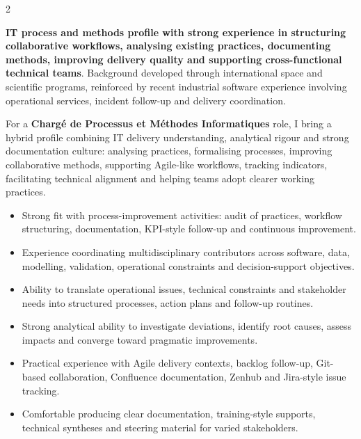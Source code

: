 \documentclass[8pt,a4paper,ragged2e,withhyper]{altacv}
\begin{document}
\begin{paracol}{2}
\switchcolumn


\textbf{IT process and methods profile with strong experience in structuring collaborative workflows, analysing existing practices, documenting methods, improving delivery quality and supporting cross-functional technical teams}. Background developed through international space and scientific programs, reinforced by recent industrial software experience involving operational services, incident follow-up and delivery coordination.

For a \textbf{Chargé de Processus et Méthodes Informatiques} role, I bring a hybrid profile combining IT delivery understanding, analytical rigour and strong documentation culture: analysing practices, formalising processes, improving collaborative methods, supporting Agile-like workflows, tracking indicators, facilitating technical alignment and helping teams adopt clearer working practices.

\begin{itemize}
  \item Strong fit with process-improvement activities: audit of practices, workflow structuring, documentation, KPI-style follow-up and continuous improvement.
  \item Experience coordinating multidisciplinary contributors across software, data, modelling, validation, operational constraints and decision-support objectives.
  \item Ability to translate operational issues, technical constraints and stakeholder needs into structured processes, action plans and follow-up routines.
  \item Strong analytical ability to investigate deviations, identify root causes, assess impacts and converge toward pragmatic improvements.
  \item Practical experience with Agile delivery contexts, backlog follow-up, Git-based collaboration, Confluence documentation, Zenhub and Jira-style issue tracking.
  \item Comfortable producing clear documentation, training-style supports, technical syntheses and steering material for varied stakeholders.
\end{itemize}



\end{paracol}
\end{document}
